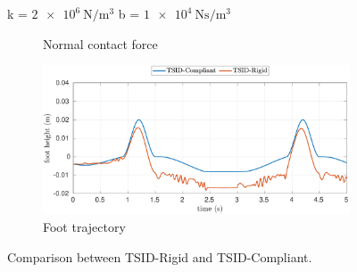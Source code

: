 \begin{figure}[t]
\begin{myframe}{k = $\SI{2e6}{\newton \per \meter^3}$  b = $\SI{1e4}{\newton \second \per \meter^3}$}
\begin{subfigure}[b]{0.49\textwidth}
        \caption{Normal contact force}
        \label{fig:2e6_1e4_force}
    \end{subfigure}
     \begin{subfigure}[b]{0.49\textwidth}
        \centering
        \includegraphics[height=0.151\textheight]{chapter_compliant_contact/figures/compliant_2e6_1e4_stiff_2e6_1e4_foot.pdf}
        \caption{Foot trajectory}
        \label{fig:2e6_1e4_foot}
    \end{subfigure}
    \end{myframe}
    \caption{Comparison between TSID-Rigid and TSID-Compliant.}
\end{figure}

